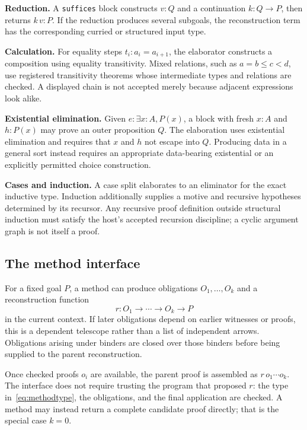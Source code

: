 \documentclass[11pt,a4paper]{article}
\theoremstyle{remark}
\newcommand{\ty}[1]{\texttt{#1}}
\begin{document}
\textbf{Reduction.} A \ty{suffices} block constructs $v:Q$ and a continuation $k:Q\to P$, then returns $k\,v:P$. If the reduction produces several subgoals, the reconstruction term has the corresponding curried or structured input type.

\textbf{Calculation.} For equality steps $t_i:a_i=a_{i+1}$, the elaborator constructs a composition using equality transitivity. Mixed relations, such as $a=b\leq c<d$, use registered transitivity theorems whose intermediate types and relations are checked. A displayed chain is not accepted merely because adjacent expressions look alike.

\textbf{Existential elimination.} Given $e:\exists x:A,P(x)$, a block with fresh $x:A$ and $h:P(x)$ may prove an outer proposition $Q$. The elaboration uses existential elimination and requires that $x$ and $h$ not escape into $Q$. Producing data in a general sort instead requires an appropriate data-bearing existential or an explicitly permitted choice construction.

\textbf{Cases and induction.} A case split elaborates to an eliminator for the exact inductive type. Induction additionally supplies a motive and recursive hypotheses determined by its recursor. Any recursive proof definition outside structural induction must satisfy the host's accepted recursion discipline; a cyclic argument graph is not itself a proof.\cite{lean-recursion}

\subsection{The method interface}
For a fixed goal $P$, a method can produce obligations $O_1,\ldots,O_k$ and a reconstruction function
\begin{equation}\label{eq:methodtype}
 r:O_1\to\cdots\to O_k\to P
\end{equation}
in the current context. If later obligations depend on earlier witnesses or proofs, this is a dependent telescope rather than a list of independent arrows. Obligations arising under binders are closed over those binders before being supplied to the parent reconstruction.

Once checked proofs $o_i$ are available, the parent proof is assembled as $r\,o_1\cdots o_k$. The interface does not require trusting the program that proposed $r$: the type in~\eqref{eq:methodtype}, the obligations, and the final application are checked. A method may instead return a complete candidate proof directly; that is the special case $k=0$.
\end{document}
